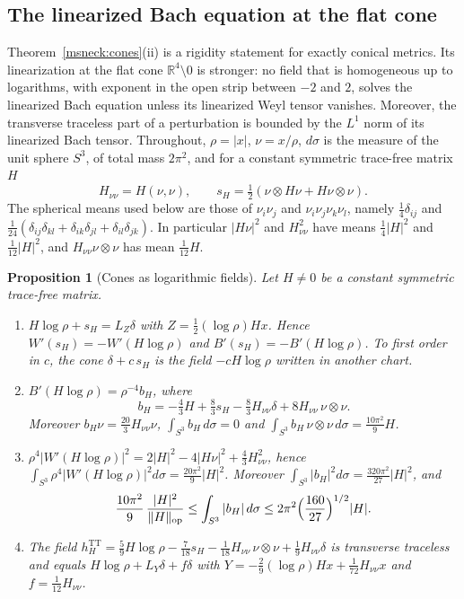 \documentclass[11pt]{article}
\numberwithin{equation}{section}
\newtheorem{proposition}[theorem]{Proposition}
\theoremstyle{definition}
\theoremstyle{remark}
\begin{document}
\subsection{The linearized Bach equation at the flat cone}
\label{msneck:linear}

Theorem~\ref{msneck:cones}(ii) is a rigidity statement for exactly
conical metrics. Its linearization at the flat cone
\(\mathbb R^4\setminus0\) is stronger: no field that is homogeneous up to
logarithms, with exponent in the open strip between \(-2\) and \(2\), solves
the linearized Bach equation unless its linearized Weyl tensor vanishes.
Moreover, the transverse traceless part of a perturbation is bounded by
the \(L^1\) norm of its linearized Bach tensor. Throughout, \(\rho=|x|\),
\(\nu=x/\rho\), \(d\sigma\) is the measure of the unit sphere \(S^3\), of
total mass \(2\pi^2\), and for a constant symmetric trace-free matrix \(H\)
\[
 H_{\nu\nu}=H(\nu,\nu),\qquad s_H=\tfrac12(\nu\otimes H\nu+H\nu\otimes\nu).
\]
The spherical means used below are those of \(\nu_i\nu_j\) and
\(\nu_i\nu_j\nu_k\nu_l\), namely \(\tfrac14\delta_{ij}\) and
\(\tfrac1{24}(\delta_{ij}\delta_{kl}+\delta_{ik}\delta_{jl}+\delta_{il}\delta_{jk})\).
In particular \(|H\nu|^2\) and \(H_{\nu\nu}^2\) have means \(\tfrac14|H|^2\)
and \(\tfrac1{12}|H|^2\), and \(H_{\nu\nu}\nu\otimes\nu\) has mean \(\tfrac1{12}H\).

\begin{proposition}[Cones as logarithmic fields]\label{msneck:log}
Let \(H\ne0\) be a constant symmetric trace-free matrix.
\begin{enumerate}[label=\textup{(\roman*)}]
\item \(H\log\rho+s_H=L_Z\delta\) with \(Z=\tfrac12(\log\rho)Hx\). Hence
\(W'(s_H)=-W'(H\log\rho)\) and \(B'(s_H)=-B'(H\log\rho)\). To first order in
\(c\), the cone \(\delta+c\,s_H\) is the field \(-cH\log\rho\) written in
another chart.
\item \(B'(H\log\rho)=\rho^{-4}b_H\), where
\[
 b_H=-\tfrac43H+\tfrac83s_H-\tfrac83H_{\nu\nu}\delta+8H_{\nu\nu}\,\nu\otimes\nu .
\]
Moreover \(b_H\nu=\tfrac{20}3H_{\nu\nu}\nu\),
\(\int_{S^3}b_H\,d\sigma=0\) and
\(\int_{S^3}b_H\,\nu\otimes\nu\,d\sigma=\tfrac{10\pi^2}9H\).
\item \(\rho^4|W'(H\log\rho)|^2=2|H|^2-4|H\nu|^2+\tfrac43H_{\nu\nu}^2\),
hence \(\int_{S^3}\rho^4|W'(H\log\rho)|^2d\sigma=\tfrac{20\pi^2}9|H|^2\).
Moreover \(\int_{S^3}|b_H|^2d\sigma=\tfrac{320\pi^2}{27}|H|^2\), and
\[
 \frac{10\pi^2}9\,\frac{|H|^2}{\|H\|_{\mathrm{op}}}\le\int_{S^3}|b_H|\,d\sigma
 \le2\pi^2\Bigl(\frac{160}{27}\Bigr)^{1/2}|H| .
\]
\item The field
\(h_H^{\mathrm{TT}}=\tfrac59H\log\rho-\tfrac7{18}s_H-\tfrac1{18}H_{\nu\nu}\,\nu\otimes\nu
+\tfrac19H_{\nu\nu}\delta\) is transverse traceless and equals
\(H\log\rho+L_Y\delta+f\delta\) with
\(Y=-\tfrac29(\log\rho)Hx+\tfrac1{72}H_{\nu\nu}x\) and
\(f=\tfrac1{12}H_{\nu\nu}\).
\end{enumerate}
\end{proposition}
\end{document}
